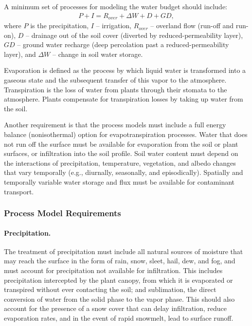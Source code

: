 A minimum set of processes for modeling the water budget should include:  
%
\begin{align}
P + I = R_{over} + \Delta W + D + GD,%
\end{align}
where 
$P$ is the precipitation, 
$I$ -- irrigation,
$R_{over}$ -- overland flow (run-off and run-on),
$D$ -- drainage out of the soil cover (diverted by reduced-permeability layer),
$GD$ -- ground water recharge (deep percolation past a reduced-permeability layer), and
$\Delta W$ -- change in soil water storage.



\noindent 
Evaporation is defined as the process by which liquid water is
transformed into a gaseous state and the subsequent transfer of this
vapor to the atmosphere.  
Transpiration is the loss of water from plants through their stomata to the atmosphere.  
Plants compensate for transpiration losses by taking up water from the soil.

Another requirement is that the process models must include a full energy balance (nonisothermal) option for
evapotranspiration processes.  
Water that does not run off the surface must be available for evaporation from the soil or plant surfaces, 
or infiltration into the soil profile. 
Soil water content must depend on the interactions of precipitation, temperature, vegetation, and albedo changes that vary temporally
(e.g., diurnally, seasonally, and episodically).  
Spatially and temporally variable water storage and flux must be available for contaminant transport.


\subsubsection{Process Model Requirements}

\paragraph{Precipitation. } 
The treatment of precipitation 
must include all natural sources of moisture that may reach the surface 
in the form of rain, snow, sleet, hail, dew, and fog, and must account for precipitation not available for infiltration. 
This includes precipitation intercepted by the plant canopy, from which it is evaporated
or transpired without ever contacting the soil; and sublimation, the direct conversion of water from the solid phase to the vapor phase.  
This should also account for the presence of a snow cover that can delay
infiltration, reduce evaporation rates, and in the event of rapid snowmelt, lead to surface runoff.


